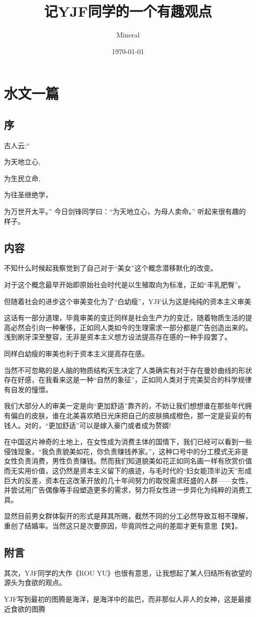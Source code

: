 \documentclass[utf8]{ctexart}
\author{Mineral}
\title{记YJF同学的一个有趣观点}
\date {\today}
\begin{document}
		\maketitle
		\section{水文一篇}
		\subsection{序}
		
		古人云:“\par 为天地立心,
		\par 为生民立命,
		\par 为往圣继绝学，
		\par 为万世开太平。”	
		今日剑锋同学曰：“为天地立心，为母人卖命。”
		听起来很有趣的样子。
		\subsection{内容}
		

		\par	不知什么时候起我察觉到了自己对于“美女”这个概念潜移默化的改变。
		\par 对于这个概念最早开始即原始社会时代是以生殖取向为标准，正如“丰乳肥臀”。
		\par 但随着社会的进步这个审美变化为了“白幼瘦”，YJF认为这是纯纯的资本主义审美
		\par 	这话有一部分道理，毕竟审美的变迁同样是社会生产力的变迁，随着物质生活的提高必然会引向一种奢侈，正如同人类如今的生理需求一部分都是广告创造出来的。浅到刷牙深至整容，无非是资本主义想方设法提高存在感的一种手段罢了。
		\par 同样白幼瘦的审美也利于资本主义提高存在感。
		\par 当然不可忽略的是人脑的物质结构天生决定了人类确实有对于存在曼妙曲线的形状存在好感，在我看来这是一种“自然的象征”，正如同人类对于完美契合的科学规律有自发的憧憬。
		\par 我们大部分人的审美一定是向“更加舒适”靠齐的，不妨让我们想想谁在那些年代拥有偏白的皮肤，谁在北美喜欢晒日光床把自己的皮肤搞成橙色，那一定是妥妥的有钱人。对的，“更加舒适”可以是嫁入豪门或者成为赘婿!
		\par 在中国这片神奇的土地上，在女性成为消费主体的国情下，我们已经可以看到一些侵蚀现象，“我负责貌美如花，你负责赚钱养家。”，这种口号中的分工模式无非是女性负责消费，男性负责赚钱。然而我们知道貌美如花正如同名画一样有欣赏价值而无实用价值，这仍然是资本主义留下的痕迹，与毛时代的“妇女能顶半边天”形成巨大的反差，资本在这改革开放的几十年间努力的取悦需求旺盛的人群——女性，并尝试用广告偶像等手段塑造更多的需求，努力将女性进一步异化为纯粹的消费工具。
		\par 显然目前男女群体裂开的形式是拜其所赐，截然不同的分工必然导致互相不理解，重创了结婚率。当然这只是次要原因，毕竟同性之间的差距才更有意思【笑】。
		\subsection{附言}
		\par 其次，YJF同学的大作《ROU YU》也很有意思，让我想起了某人归结所有欲望的源头为食欲的观点。
		\par YJF写到最初的图腾是海洋，是海洋中的盐巴，而非那似人非人的女神，这是最接近食欲的图腾
					
\end{document}
